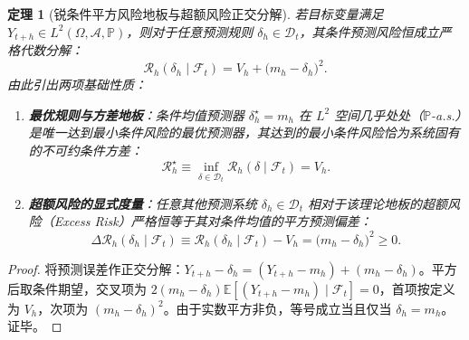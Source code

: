 \documentclass[11pt,a4paper]{article}
\theoremstyle{plain}
\newtheorem{theorem}{定理}
\theoremstyle{definition}
\begin{document}
\begin{theorem}[锐条件平方风险地板与超额风险正交分解]\label{thm:sharp_floor}
若目标变量满足 $Y_{t+h} \in L^2(\Omega, \mathcal{A}, \mathbb{P})$，则对于任意预测规则 $\delta_h \in \mathcal{D}_t$，其条件预测风险恒成立严格代数分解：
\begin{equation}
\mathcal{R}_h(\delta_h \mid \mathcal{F}_t) = V_h + \bigl(m_h - \delta_h\bigr)^2. \label{eq:sharp_floor_identity}
\end{equation}
由此引出两项基础性质：
\begin{enumerate}
\item \textbf{最优规则与方差地板}：条件均值预测器 $\delta_h^\star = m_h$ 在 $L^2$ 空间几乎处处（$\mathbb{P}$-a.s.）是唯一达到最小条件风险的最优预测器，其达到的最小条件风险恰为系统固有的不可约条件方差：
\begin{equation}
\mathcal{R}_h^\star \equiv \inf_{\delta \in \mathcal{D}_t} \mathcal{R}_h(\delta \mid \mathcal{F}_t) = V_h. \label{eq:sharp_floor_min}
\end{equation}
\item \textbf{超额风险的显式度量}：任意其他预测系统 $\delta_h \in \mathcal{D}_t$ 相对于该理论地板的超额风险（Excess Risk）严格恒等于其对条件均值的平方预测偏差：
\begin{equation}
\Delta \mathcal{R}_h(\delta_h \mid \mathcal{F}_t) \equiv \mathcal{R}_h(\delta_h \mid \mathcal{F}_t) - V_h = \bigl(m_h - \delta_h\bigr)^2 \ge 0. \label{eq:sharp_floor_excess}
\end{equation}
\end{enumerate}
\end{theorem}

\begin{proof}
将预测误差作正交分解：$Y_{t+h} - \delta_h = (Y_{t+h} - m_h) + (m_h - \delta_h)$。平方后取条件期望，交叉项为 $2(m_h - \delta_h)\mathbb{E}[(Y_{t+h} - m_h)\mid\mathcal{F}_t] = 0$，首项按定义为 $V_h$，次项为 $(m_h - \delta_h)^2$。由于实数平方非负，等号成立当且仅当 $\delta_h = m_h$。证毕。
\end{proof}
\end{document}
